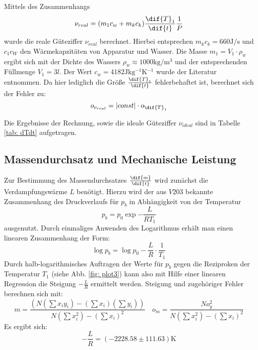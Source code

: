 Mittels des Zusammenhangs
\begin{equation}
  \nu_{real} = (m_1 c_w + m_k c_k) \frac{\dif{T}_1}{\dif{t}} \frac{1}{P} %
\end{equation}
wurde die reale Güteziffer $\nu_{real}$ berechnet. Hierbei entsprechen $m_k c_k = 660 \si{\joule \per \second}$ und $c_1 c_W$ den Wärmekapzitäten von Apparatur und Wasser. Die Masse $m_1 = V_1 \cdot \rho_w$ ergibt sich mit
der Dichte des Wassers $\rho_w \approx 1000 \si{\kilo \gram \per \meter ^3}$  und der entsprechenden Füllmenge $V_1 = 3 l$. Der Wert $c_w = 4182\si{\joule \kilo \gram^{-1} \kelvin^{-1}}$ wurde der Literatur \cite{demtröder} entnommen. %
Da hier lediglich die Größe $\frac{\dif{T}_1}{\dif{t}}$ fehlerbehaftet ist, berechnet sich der Fehler zu: %
\begin{equation}
  o_{\nu_{real}} = \left| const \right| \cdot o_{\dif{T}_1} %
  \label{eq: errorconst}
\end{equation}

Die Ergebnisse der Rechnung, sowie die ideale Güteziffer $\nu_{ideal}$ sind in Tabelle \ref{tab: dTdt} aufgetragen.


\subsection{Massendurchsatz und Mechanische Leistung}
Zur Bestimmung des Massendurchsatzes $\frac{\dif{m}}{\dif{t}}$ wird zunächst die Verdampfungswärme $L$ benötigt. Hierzu wird der aus $V203$ \cite{anleitung203} bekannte Zusammenhang des Druckverlaufs für $p_b$ in Abhängigkeit von der Temperatur%
\begin{equation}
  p_b = p_0 \exp{-\frac{L}{R T_1}} %
\end{equation}
ausgenutzt. Durch einmaliges Anwenden des Logarithmus erhält man einen linearen Zusammenhang der Form:
\begin{equation}
  \log{p_b} = \log{p_0} -\frac{L}{R} \cdot \frac{1}{T_1}
\end{equation}
Durch halb-logarithmisches Auftragen der Werte für $p_b$ gegen die Reziproken der Temperatur $T_1$ (siehe Abb. \ref{fig: plot3}) kann also mit Hilfe einer linearen Regression die Steigung $-\frac{L}{R}$ ermittelt werden.
Steigung und zugehöriger Fehler berechnen sich mit:
\begin{equation}
  m= \frac{\left( N  (\sum x_i y_i) - (\sum x_i)(\sum y_i)\right)}{N (\sum x_i^2)- (\sum x_i)^2 }    \quad   o_m=\frac{N o_y^2}{N (\sum x_i^2)- (\sum x_i)^2 }
\end{equation}
Es ergibt sich:
\begin{equation}
  -\frac{L}{R} =  (-2228.58 \pm 111.63) \si{\kelvin}
\end{equation}

